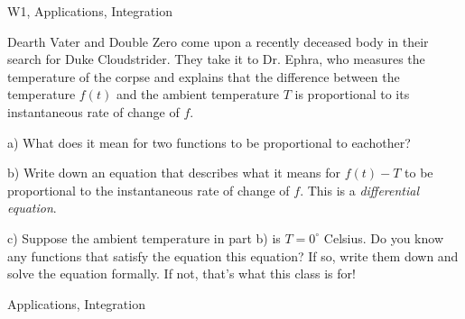 \begin{tagblock}{W1, Applications, Integration}
\begin{question}
	
 Dearth Vater and Double Zero come upon a recently deceased body in their search for Duke Cloudstrider. They take it to Dr. Ephra, who measures the temperature of the corpse and explains that the difference between the temperature $f(t)$ and the ambient temperature $T$ is proportional to its instantaneous rate of change of $f$. 

\bigskip

a) What does it mean for two functions to be proportional to eachother? 

\bigskip

b) Write down an equation that describes what it means for $f(t)-T$ to be proportional to the instantaneous rate of change of $f$. This is a \textit{differential equation}.

\bigskip

c) Suppose the ambient temperature in part b) is  $T=0^{\circ}$ Celsius. Do you know any functions that satisfy the equation this equation? If so, write them down and solve the equation formally. If not, that's what this class is for!

    
\begin{tags}
        Applications, Integration
\end{tags}
    
\begin{diary}
\end{diary}
	
\begin{solution}

\end{solution}
	
\end{question}

\end{tagblock}


